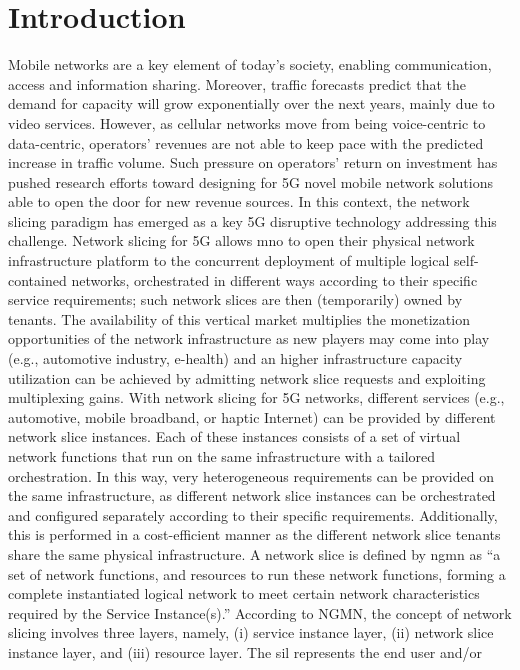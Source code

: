 \documentclass{article}
\begin{document}
\section{Introduction}
Mobile networks are a key element of today's society, enabling communication, access
and information sharing. Moreover, traffic forecasts predict that the
demand for capacity will grow exponentially over the next years, mainly due to
video services. However, as cellular networks move from being voice-centric to
data-centric, operators' revenues are not able to keep pace with the predicted
increase in traffic volume. Such pressure on operators' return on investment has
pushed research efforts toward designing for 5G novel mobile network solutions
able to open the door for new revenue sources. In this context, the network
slicing paradigm has emerged as a key 5G disruptive technology addressing this
challenge.
Network slicing for 5G allows \gls{mno} to open
their physical network infrastructure platform to the concurrent deployment
of multiple logical self-contained networks, orchestrated in different ways according
to their specific service requirements; such network slices are then
(temporarily) owned by tenants. The availability of this vertical market multiplies
the monetization opportunities of the network infrastructure as new
players may come into play (e.g., automotive industry, e-health) and an higher
infrastructure capacity utilization can be achieved by admitting network slice
requests and exploiting multiplexing gains.
With network slicing for 5G networks, different services (e.g., automotive,
mobile broadband, or haptic Internet) can be provided by different network slice
instances. Each of these instances consists of a set of virtual network functions
that run on the same infrastructure with a tailored orchestration. In this way,
very heterogeneous requirements can be provided on the same infrastructure, as
different network slice instances can be orchestrated and configured separately
according to their specific requirements. Additionally, this is performed in a
cost-efficient manner as the different network slice tenants share the same
physical infrastructure.
A network slice is defined by \gls{ngmn} as “a set of network functions, and
resources to run these network functions, forming a complete instantiated
logical network to meet certain network characteristics required by the Service
Instance(s).”
According to NGMN, the concept of network slicing involves three layers,
namely, (i) service instance layer, (ii) network slice instance layer, and (iii)
resource layer. The \gls{sil} represents the end user and/or
\end{document}
